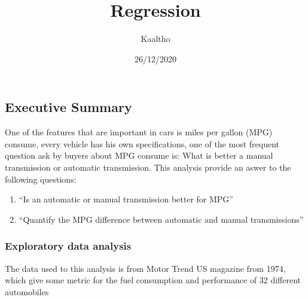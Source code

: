 \documentclass[
]{article}
\title{Regression}
\author{Kaaltho}
\date{26/12/2020}
\providecommand{\tightlist}{%
  \setlength{\itemsep}{0pt}\setlength{\parskip}{0pt}}
\begin{document}
\maketitle

\hypertarget{executive-summary}{%
\subsection{Executive Summary}\label{executive-summary}}

One of the features that are important in cars is miles per gallon (MPG)
consume, every vehicle has his own specifications, one of the most
frequent question ask by buyers about MPG consume is: What is better a
manual transmission or automatic transmission. This analysis provide an
aswer to the following questions:

\begin{enumerate}
\def\labelenumi{\arabic{enumi}.}
\tightlist
\item
  ``Is an automatic or manual transmission better for MPG''
\item
  ``Quantify the MPG difference between automatic and manual
  transmissions''
\end{enumerate}

\hypertarget{exploratory-data-analysis}{%
\subsubsection{Exploratory data
analysis}\label{exploratory-data-analysis}}

The data used to this analysis is from Motor Trend US magazine from
1974, which give some metric for the fuel consumption and performance of
32 different automobiles
\end{document}
